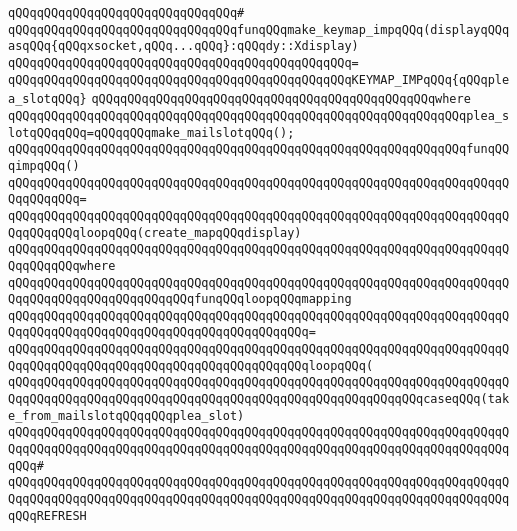 \verb|qQQqqQQqqQQqqQQqqQQqqQQqqQQqqQQq#|\newline
\verb|qQQqqQQqqQQqqQQqqQQqqQQqqQQqqQQqfunqQQqmake_keymap_impqQQq(displayqQQqasqQQq{qQQqxsocket,qQQq...qQQq}:qQQqdy::Xdisplay)|\newline
\verb|qQQqqQQqqQQqqQQqqQQqqQQqqQQqqQQqqQQqqQQqqQQqqQQq=|\newline
\verb|qQQqqQQqqQQqqQQqqQQqqQQqqQQqqQQqqQQqqQQqqQQqqQQqKEYMAP_IMPqQQq{qQQqplea_slotqQQq}|\newline
\verb|qQQqqQQqqQQqqQQqqQQqqQQqqQQqqQQqqQQqqQQqqQQqqQQqwhere|\newline
\newline
\verb|qQQqqQQqqQQqqQQqqQQqqQQqqQQqqQQqqQQqqQQqqQQqqQQqqQQqqQQqqQQqqQQqplea_slotqQQqqQQq=qQQqqQQqmake_mailslotqQQq();|\newline
\newline
\verb|qQQqqQQqqQQqqQQqqQQqqQQqqQQqqQQqqQQqqQQqqQQqqQQqqQQqqQQqqQQqqQQqfunqQQqimpqQQq()|\newline
\verb|qQQqqQQqqQQqqQQqqQQqqQQqqQQqqQQqqQQqqQQqqQQqqQQqqQQqqQQqqQQqqQQqqQQqqQQqqQQqqQQq=|\newline
\verb|qQQqqQQqqQQqqQQqqQQqqQQqqQQqqQQqqQQqqQQqqQQqqQQqqQQqqQQqqQQqqQQqqQQqqQQqqQQqqQQqloopqQQq(create_mapqQQqdisplay)|\newline
\verb|qQQqqQQqqQQqqQQqqQQqqQQqqQQqqQQqqQQqqQQqqQQqqQQqqQQqqQQqqQQqqQQqqQQqqQQqqQQqqQQqwhere|\newline
\newline
\verb|qQQqqQQqqQQqqQQqqQQqqQQqqQQqqQQqqQQqqQQqqQQqqQQqqQQqqQQqqQQqqQQqqQQqqQQqqQQqqQQqqQQqqQQqqQQqqQQqfunqQQqloopqQQqmapping|\newline
\verb|qQQqqQQqqQQqqQQqqQQqqQQqqQQqqQQqqQQqqQQqqQQqqQQqqQQqqQQqqQQqqQQqqQQqqQQqqQQqqQQqqQQqqQQqqQQqqQQqqQQqqQQqqQQqqQQq=|\newline
\verb|qQQqqQQqqQQqqQQqqQQqqQQqqQQqqQQqqQQqqQQqqQQqqQQqqQQqqQQqqQQqqQQqqQQqqQQqqQQqqQQqqQQqqQQqqQQqqQQqqQQqqQQqqQQqqQQqloopqQQq(|\newline
\verb|qQQqqQQqqQQqqQQqqQQqqQQqqQQqqQQqqQQqqQQqqQQqqQQqqQQqqQQqqQQqqQQqqQQqqQQqqQQqqQQqqQQqqQQqqQQqqQQqqQQqqQQqqQQqqQQqqQQqqQQqqQQqqQQqcaseqQQq(take_from_mailslotqQQqqQQqplea_slot)|\newline
\verb|qQQqqQQqqQQqqQQqqQQqqQQqqQQqqQQqqQQqqQQqqQQqqQQqqQQqqQQqqQQqqQQqqQQqqQQqqQQqqQQqqQQqqQQqqQQqqQQqqQQqqQQqqQQqqQQqqQQqqQQqqQQqqQQqqQQqqQQqqQQqqQQq#|\newline
\verb|qQQqqQQqqQQqqQQqqQQqqQQqqQQqqQQqqQQqqQQqqQQqqQQqqQQqqQQqqQQqqQQqqQQqqQQqqQQqqQQqqQQqqQQqqQQqqQQqqQQqqQQqqQQqqQQqqQQqqQQqqQQqqQQqqQQqqQQqqQQqqQQqREFRESH|\newline

